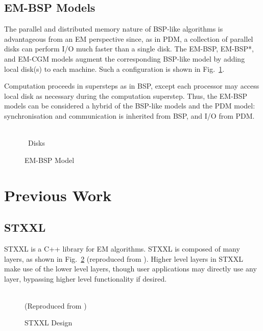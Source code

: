 \documentclass[12pt]{carletoncsthesis}
\begin{document}
\subsection{EM-BSP Models}


The parallel and distributed memory nature of BSP-like algorithms is
advantageous from an EM perspective since, as in PDM, a collection of parallel
disks can perform I/O much faster than a single disk.  The EM-BSP, EM-BSP*,
and EM-CGM models \cite{dhthesis}\cite{emsimulation}\cite{bspem} augment
the corresponding BSP-like model by adding local disk(s) to each machine.
Such a configuration is shown in Fig.~\ref{pems1_model}.

Computation proceeds in supersteps as in BSP, except each processor may
access local disk as necessary during the computation superstep.  Thus,
the EM-BSP models can be considered a hybrid of the BSP-like models and
the PDM model: synchronisation and communication is inherited from BSP,
and I/O from PDM.

\begin{figure}[h]
\begin{center}
	 \\
~Disks
\end{center}
\caption{EM-BSP Model}
\label{pems1_model}
\end{figure}


\section{Previous Work}


\subsection{STXXL}
\label{stxxl-sec}


STXXL is a C++ library for EM algorithms.  STXXL is composed of many layers, as
shown in Fig.~\ref{stxxl_layers} (reproduced from \cite{stxxl}).  Higher level
layers in STXXL make use of the lower level layers, though user applications
may directly use any layer, bypassing higher level functionality if desired.

\begin{figure}[ht]
\begin{center}
\\
(Reproduced from \cite{stxxl})
\end{center}
\caption{STXXL Design}
\label{stxxl_layers}
\end{figure}
\end{document}
